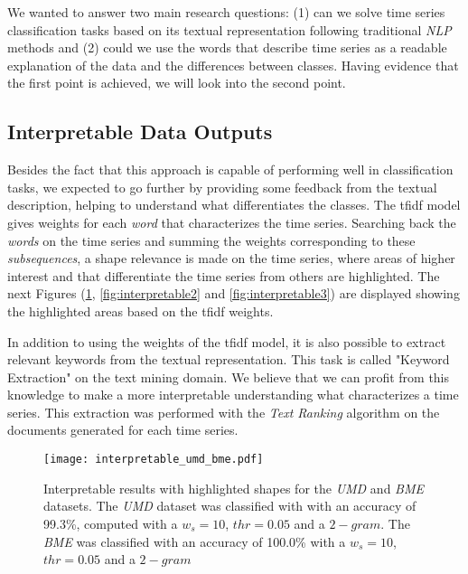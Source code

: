 We wanted to answer two main research questions: (1) can we solve time series classification tasks based on its textual representation following traditional \textit{NLP} methods and (2) could we use the words that describe time series as a readable explanation of the data and the differences between classes. Having evidence that the first point is achieved, we will look into the second point.

\subsection{Interpretable Data Outputs}

Besides the fact that this approach is capable of performing well in classification tasks, we expected to go further by providing some feedback from the textual description, helping to understand what differentiates the classes. The \gls{tfidf} model gives weights for each \textit{word} that characterizes the time series. Searching back the \textit{words} on the time series and summing the weights corresponding to these \textit{subsequences}, a shape relevance is made on the time series, where areas of higher interest and that differentiate the time series from others are highlighted. The next Figures (\ref{fig:interpretable1}, \ref{fig:interpretable2} and \ref{fig:interpretable3}) are displayed showing the highlighted areas based on the \gls{tfidf} weights.
\par
In addition to using the weights of the \gls{tfidf} model, it is also possible to extract relevant keywords from the textual representation. This task is called "Keyword Extraction" on the text mining domain. We believe that we can profit from this knowledge to make a more interpretable understanding what characterizes a time series. This extraction was performed with the \textit{Text Ranking} algorithm on the documents generated for each time series.

\begin{figure}[h]
    \centering
    \texttt{[image: interpretable\_umd\_bme.pdf]}
    \caption{Interpretable results with highlighted shapes for the \textit{UMD} and \textit{BME} datasets. The \textit{UMD} dataset was classified with with an accuracy of 99.3\%, computed with a $w_s=10$, $thr=0.05$ and a $2-gram$. The \textit{BME} was classified with an accuracy of 100.0\% with a $w_s=10$, $thr=0.05$ and a $2-gram$}
    \label{fig:interpretable1}
\end{figure}

